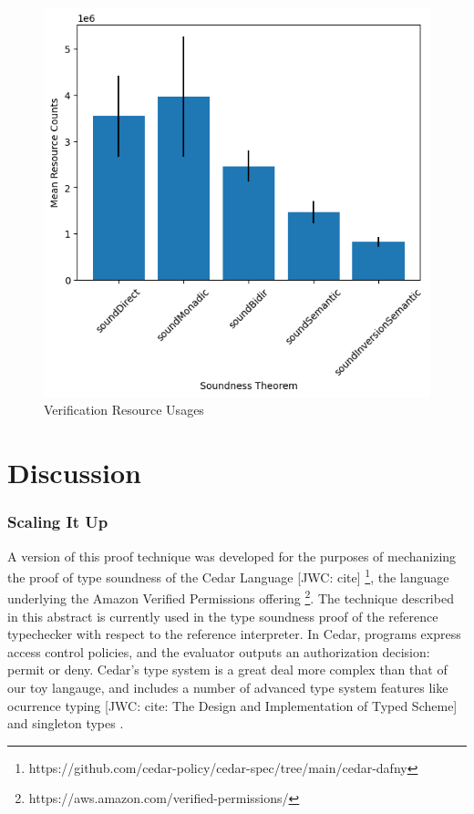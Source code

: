 \documentclass[sigplan,review,screen,anonymous]{acmart}
\newcommand{\comm}[3]{\textcolor{#1}{[#2: #3]}}
\newcommand{\jwc}[1]{\comm{dkgreen}{JWC}{#1}}
\begin{document}
\begin{figure}
  \includegraphics[scale=0.5]{costgraph.png}
  \caption{Verification Resource Usages}
  \label{fig:cost-results}
\end{figure}

\section{Discussion}

\subsubsection*{Scaling It Up}
A version of this proof technique was developed for the purposes of mechanizing the proof of type soundness
of the Cedar Language \jwc{cite} \footnote{https://github.com/cedar-policy/cedar-spec/tree/main/cedar-dafny},
the language underlying the Amazon Verified Permissions offering \footnote{https://aws.amazon.com/verified-permissions/}.
The technique described in this abstract is currently used in the type soundness proof of the reference typechecker with respect to the reference interpreter.
In Cedar, programs express access control policies, and the evaluator outputs an authorization decision: permit or deny.
Cedar's type system is a great deal more complex than that of our toy langauge, and includes a number of advanced type system features like ocurrence typing \jwc{cite: The Design and Implementation of Typed Scheme} and
singleton types \cite{https://dl.acm.org/doi/10.5555/645867.670933}.
\end{document}
